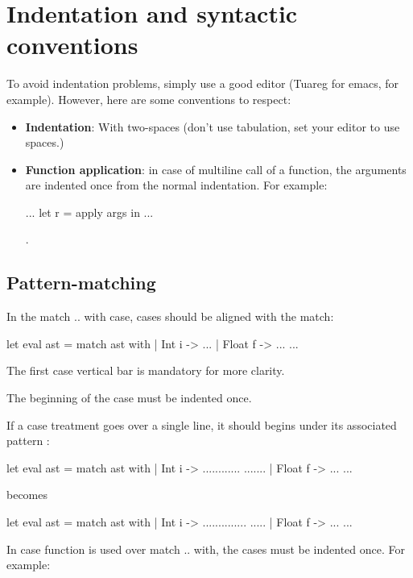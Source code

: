 \documentclass[12pt,a4paper]{article}
\begin{document}
\section{Indentation and syntactic conventions}

To avoid indentation problems, simply use a good editor (Tuareg for emacs, for
example). However, here are some conventions to respect:

\begin{itemize}
\item \textbf{Indentation}: With two-spaces (don't use tabulation, set your
  editor to use spaces.)
\item \textbf{Function application}: in case of multiline call of a function,
  the arguments are indented once from the normal indentation. For example:
  \begin{OCaml}
    ...
    let r = apply
        args in
    ...
  \end{OCaml}.
\end{itemize}

\subsection*{Pattern-matching}

In the \textsf{match .. with} case, cases should be aligned with the
\textsf{match}:

\begin{OCaml}
let eval ast =
  match ast with
  | Int i -> ...
  | Float f -> ...
  ...
\end{OCaml}

The first case vertical bar is mandatory for more clarity.

The beginning of the case must be indented once.
\newline

If a case treatment goes over a single line, it should begins under its associated pattern :

\begin{OCaml}
let eval ast =
  match ast with
  | Int i -> ............
    .......
  | Float f -> ...
  ...
\end{OCaml}

becomes

\begin{OCaml}
let eval ast =
  match ast with
  | Int i ->
    ..............
    .....
  | Float f -> ...
  ...
\end{OCaml}

In case \textsf{function} is used over \textsf{match .. with}, the cases must be
indented once. For example:
\end{document}
